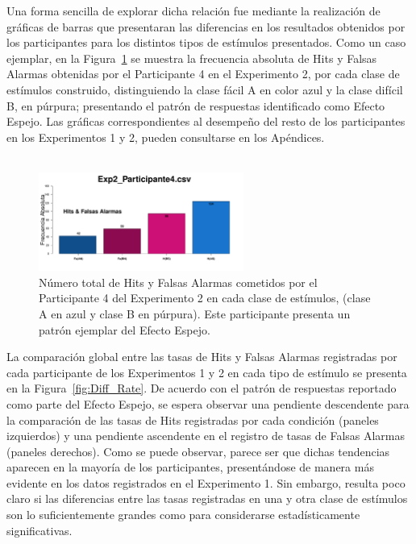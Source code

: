 Una forma sencilla de explorar dicha relación fue mediante la realización de gráficas de barras que presentaran las diferencias en los resultados obtenidos por los participantes para los distintos tipos de estímulos presentados. Como un caso ejemplar, en la Figura~\ref{fig:MirrorRate_E2_P4} se muestra la frecuencia absoluta de Hits y Falsas Alarmas obtenidas por el Participante 4 en el Experimento 2, por cada clase de estímulos construido, distinguiendo la clase fácil A en color azul y la clase difícil B, en púrpura; presentando el patrón de respuestas identificado como Efecto Espejo. Las gráficas correspondientes al desempeño del resto de los participantes en los Experimentos 1 y 2, pueden consultarse en los Apéndices.\\
\\

\begin{figure}[th]
\centering
\includegraphics[width=0.60\textwidth]{Figures/MirrorRate_Exp2_P4}
\caption[Explorando datos individuales (ejemplo): Diferencias entre Hits y Falsas Alarmas registrados por clase de estímulo]{Número total de Hits y Falsas Alarmas cometidos por el Participante 4 del Experimento 2 en cada clase de estímulos, (clase A en azul y clase B en púrpura). Este participante presenta un patrón ejemplar del Efecto Espejo.}
\label{fig:MirrorRate_E2_P4}
\end{figure}


La comparación global entre las tasas de Hits y Falsas Alarmas registradas por cada participante de los Experimentos 1 y 2 en cada tipo de estímulo se presenta en la Figura~\ref{fig:Diff_Rate}. De acuerdo con el patrón de respuestas reportado como parte del Efecto Espejo, se espera observar una pendiente descendente para la comparación de las tasas de Hits registradas por cada condición (paneles izquierdos) y una pendiente ascendente en el registro de tasas de Falsas Alarmas (paneles derechos). Como se puede observar, parece ser que dichas tendencias aparecen en la mayoría de los participantes, presentándose de manera más evidente en los datos registrados en el Experimento 1. Sin embargo, resulta poco claro si las diferencias entre las tasas registradas en una y otra clase de estímulos son lo suficientemente grandes como para considerarse estadísticamente significativas.\\

